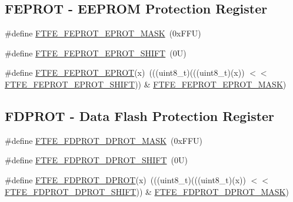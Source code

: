 \subsection*{F\+E\+P\+R\+OT -\/ E\+E\+P\+R\+OM Protection Register}
\begin{DoxyCompactItemize}
\item 
\#define \mbox{\hyperlink{group___f_t_f_e___register___masks_ga40c56d65eabafe8b67bf9e28a1ab2856}{F\+T\+F\+E\+\_\+\+F\+E\+P\+R\+O\+T\+\_\+\+E\+P\+R\+O\+T\+\_\+\+M\+A\+SK}}~(0x\+F\+F\+U)
\item 
\#define \mbox{\hyperlink{group___f_t_f_e___register___masks_gaf93b562d4d3aa274707f0cd10d19a3b3}{F\+T\+F\+E\+\_\+\+F\+E\+P\+R\+O\+T\+\_\+\+E\+P\+R\+O\+T\+\_\+\+S\+H\+I\+FT}}~(0\+U)
\item 
\#define \mbox{\hyperlink{group___f_t_f_e___register___masks_gadb8d52e77c8b850fe0dd6f751645ea63}{F\+T\+F\+E\+\_\+\+F\+E\+P\+R\+O\+T\+\_\+\+E\+P\+R\+OT}}(x)~(((uint8\+\_\+t)(((uint8\+\_\+t)(x)) $<$$<$ \mbox{\hyperlink{group___f_t_f_e___register___masks_gaf93b562d4d3aa274707f0cd10d19a3b3}{F\+T\+F\+E\+\_\+\+F\+E\+P\+R\+O\+T\+\_\+\+E\+P\+R\+O\+T\+\_\+\+S\+H\+I\+FT}})) \& \mbox{\hyperlink{group___f_t_f_e___register___masks_ga40c56d65eabafe8b67bf9e28a1ab2856}{F\+T\+F\+E\+\_\+\+F\+E\+P\+R\+O\+T\+\_\+\+E\+P\+R\+O\+T\+\_\+\+M\+A\+SK}})
\end{DoxyCompactItemize}
\subsection*{F\+D\+P\+R\+OT -\/ Data Flash Protection Register}
\begin{DoxyCompactItemize}
\item 
\#define \mbox{\hyperlink{group___f_t_f_e___register___masks_ga04902a698b747ed3e15ec54795ea38ce}{F\+T\+F\+E\+\_\+\+F\+D\+P\+R\+O\+T\+\_\+\+D\+P\+R\+O\+T\+\_\+\+M\+A\+SK}}~(0x\+F\+F\+U)
\item 
\#define \mbox{\hyperlink{group___f_t_f_e___register___masks_gaa0430b877bb9f714aa8192ac4eb3980f}{F\+T\+F\+E\+\_\+\+F\+D\+P\+R\+O\+T\+\_\+\+D\+P\+R\+O\+T\+\_\+\+S\+H\+I\+FT}}~(0\+U)
\item 
\#define \mbox{\hyperlink{group___f_t_f_e___register___masks_gaedb8c0b9187a153561329cd7a797a27c}{F\+T\+F\+E\+\_\+\+F\+D\+P\+R\+O\+T\+\_\+\+D\+P\+R\+OT}}(x)~(((uint8\+\_\+t)(((uint8\+\_\+t)(x)) $<$$<$ \mbox{\hyperlink{group___f_t_f_e___register___masks_gaa0430b877bb9f714aa8192ac4eb3980f}{F\+T\+F\+E\+\_\+\+F\+D\+P\+R\+O\+T\+\_\+\+D\+P\+R\+O\+T\+\_\+\+S\+H\+I\+FT}})) \& \mbox{\hyperlink{group___f_t_f_e___register___masks_ga04902a698b747ed3e15ec54795ea38ce}{F\+T\+F\+E\+\_\+\+F\+D\+P\+R\+O\+T\+\_\+\+D\+P\+R\+O\+T\+\_\+\+M\+A\+SK}})
\end{DoxyCompactItemize}


